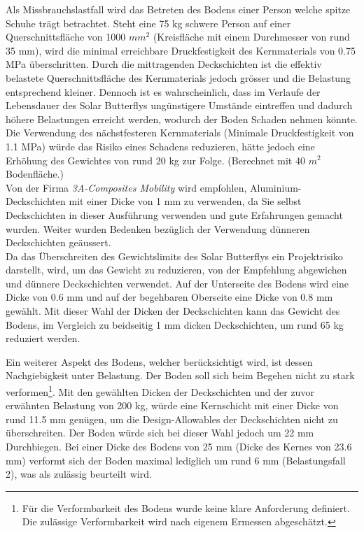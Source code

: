 Als Missbrauchslastfall wird das Betreten des Bodens einer Person welche \glqq spitze Schuhe\grqq{} trägt betrachtet. Steht eine 75 kg schwere Person auf einer Querschnittsfläche von 1000 $mm^2$ (Kreisfläche mit einem Durchmesser von rund 35 mm), wird die minimal erreichbare Druckfestigkeit des Kernmaterials von 0.75 MPa überschritten. Durch die mittragenden Deckschichten ist die effektiv belastete Querschnittsfläche des Kernmaterials jedoch grösser und die Belastung entsprechend kleiner. Dennoch ist es wahrscheinlich, dass im Verlaufe der Lebensdauer des Solar Butterflys ungünstigere Umstände eintreffen und dadurch höhere Belastungen erreicht werden, wodurch der Boden Schaden nehmen könnte. Die Verwendung des nächstfesteren Kernmaterials (Minimale Druckfestigkeit von 1.1 MPa) würde das Risiko eines Schadens reduzieren, hätte jedoch eine Erhöhung des Gewichtes von rund 20 kg zur Folge. (Berechnet mit 40 $m^2$ Bodenfläche.)\\
Von der Firma \emph{3A-Composites Mobility} wird empfohlen, Aluminium-Deckschichten mit einer Dicke von 1 mm zu verwenden, da Sie selbst Deckschichten in dieser Ausführung verwenden und gute Erfahrungen gemacht wurden. Weiter wurden Bedenken bezüglich der Verwendung dünneren Deckschichten geäussert.\\
Da das Überschreiten des Gewichtslimits des Solar Butterflys ein Projektrisiko darstellt, wird, um das Gewicht zu reduzieren, von der Empfehlung abgewichen und dünnere Deckschichten verwendet. Auf der Unterseite des Bodens wird eine Dicke von 0.6 mm und auf der begehbaren Oberseite eine Dicke von 0.8 mm gewählt. Mit dieser Wahl der Dicken der Deckschichten kann das Gewicht des Bodens, im Vergleich zu beidseitig 1 mm dicken Deckschichten, um rund 65 kg reduziert werden.

Ein weiterer Aspekt des Bodens, welcher berücksichtigt wird, ist dessen Nachgiebigkeit unter Belastung. Der Boden soll sich beim Begehen nicht zu stark verformen\footnote{Für die Verformbarkeit des Bodens wurde keine klare Anforderung definiert. Die zulässige Verformbarkeit wird nach eigenem Ermessen abgeschätzt.}.  Mit den gewählten Dicken der Deckschichten und der zuvor erwähnten Belastung von 200 kg, würde eine Kernschicht mit einer Dicke von rund 11.5 mm genügen, um die Design-Allowables der Deckschichten nicht zu überschreiten. Der Boden würde sich bei dieser Wahl jedoch um 22 mm Durchbiegen. Bei einer Dicke des Bodens von 25 mm (Dicke des Kernes von 23.6 mm) verformt sich der Boden maximal lediglich um rund 6 mm (Belastungsfall 2), was als zulässig beurteilt wird.

